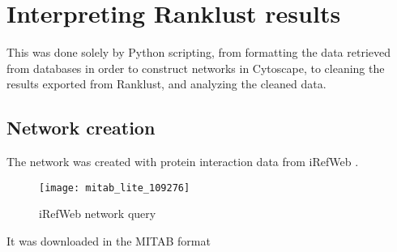 \chapter{Interpreting Ranklust results}
This was done solely by Python scripting, from formatting the data retrieved
from databases in order to construct networks in Cytoscape, to cleaning the
results exported from Ranklust, and analyzing the cleaned data.

\section{Network creation}
The network was created with protein interaction data from iRefWeb
\cite{irefweb}. 

\begin{figure}[H]
    \centering
    \caption{iRefWeb network query}
    \label{fig:irefweb}
    \texttt{[image: mitab\_lite\_109276]}
\end{figure}

It was downloaded in the MITAB format 
